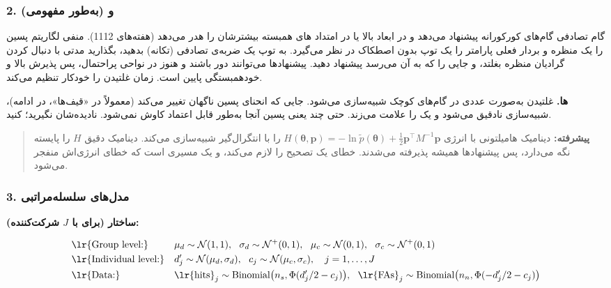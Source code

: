 \subsubsection{\texorpdfstring{2.  و
 (به‌طور
مفهومی)}{2. Hamiltonian Monte Carlo و NUTS (به‌طور مفهومی)}}

 گام تصادفی گام‌های کورکورانه پیشنهاد می‌دهد و در ابعاد
بالا یا در امتداد های همبسته بیشترشان را هدر می‌دهد (هفته‌های
11\lr{--}12). \textbf{}  منفی لگاریتم
پسین را یک منظره و بردار فعلی پارامتر را یک توپ بدون اصطکاک در نظر
می‌گیرد. به توپ یک ضربه‌ی تصادفی (تکانه) بدهید، بگذارید مدتی با دنبال کردن
گرادیان منظره بغلتد، و جایی را که به آن می‌رسد پیشنهاد دهید. پیشنهادها
می‌توانند دور باشند و هنوز در نواحی پراحتمال، پس پذیرش بالا و خودهمبستگی
پایین است. \textbf{}  زمان غلتیدن را
خودکار تنظیم می‌کند.

\textbf{ها.} غلتیدن به‌صورت عددی در گام‌های کوچک شبیه‌سازی
می‌شود. جایی که انحنای پسین ناگهان تغییر می‌کند (معمولاً در «قیف‌ها»، در
ادامه)، شبیه‌سازی نادقیق می‌شود و  یک \textbf{}
 را علامت می‌زند. حتی چند  یعنی
پسین آنجا به‌طور قابل اعتماد کاوش نمی‌شود. نادیده‌شان نگیرید؛
 کنید.

\begin{quote}
\textbf{پیشرفته:}  دینامیک هامیلتونی با انرژی
\(H(\boldsymbol\theta,\allowbreak \mathbf{p}) = -\ln\tilde p(\boldsymbol\theta) + \tfrac12\mathbf{p}^\top M^{-1}\mathbf{p}\)
را با انتگرال‌گیر  شبیه‌سازی می‌کند. دینامیک دقیق \(H\) را
پایسته نگه می‌دارد، پس پیشنهادها همیشه پذیرفته می‌شدند. خطای 
یک تصحیح  را لازم می‌کند، و یک  مسیری است
که خطای انرژی‌اش منفجر می‌شود.
\end{quote}

\subsubsection{3. مدل‌های سلسله‌مراتبی}

\textbf{ساختار (برای  با \(J\) شرکت‌کننده):}

\[
\begin{aligned}
&\text{\lr{Group level:}} && \mu_d \sim \mathcal{N}(1, 1),\ \ \sigma_d \sim \mathcal{N}^{+}(0, 1),\ \ \mu_c \sim \mathcal{N}(0, 1),\ \ \sigma_c \sim \mathcal{N}^{+}(0, 1)\\
&\text{\lr{Individual level:}} && d'_j \sim \mathcal{N}(\mu_d, \sigma_d),\ \ c_j \sim \mathcal{N}(\mu_c, \sigma_c), \quad j = 1, \dots, J\\
&\text{\lr{Data:}} && \text{\lr{hits}}_j \sim \mathrm{Binomial}\big(n_s, \Phi(d'_j/2 - c_j)\big),\ \ \text{\lr{FAs}}_j \sim \mathrm{Binomial}\big(n_n, \Phi(-d'_j/2 - c_j)\big)
\end{aligned}
\]

